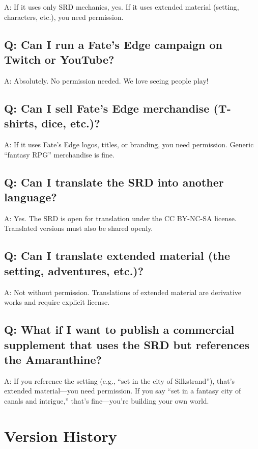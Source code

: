\documentclass[11pt]{article}
\begin{document}
A: If it uses only SRD mechanics, yes. If it uses extended material (setting, characters, etc.), you need permission.

\subsection*{Q: Can I run a Fate's Edge campaign on Twitch or YouTube?}

A: Absolutely. No permission needed. We love seeing people play!

\subsection*{Q: Can I sell Fate's Edge merchandise (T-shirts, dice, etc.)?}

A: If it uses Fate's Edge logos, titles, or branding, you need permission. Generic ``fantasy RPG'' merchandise is fine.

\subsection*{Q: Can I translate the SRD into another language?}

A: Yes. The SRD is open for translation under the CC BY-NC-SA license. Translated versions must also be shared openly.

\subsection*{Q: Can I translate extended material (the setting, adventures, etc.)?}

A: Not without permission. Translations of extended material are derivative works and require explicit license.

\subsection*{Q: What if I want to publish a commercial supplement that uses the SRD but references the Amaranthine?}

A: If you reference the setting (e.g., ``set in the city of Silkstrand''), that's extended material---you need permission. If you say ``set in a fantasy city of canals and intrigue,'' that's fine---you're building your own world.

\section*{Version History}
\end{document}
